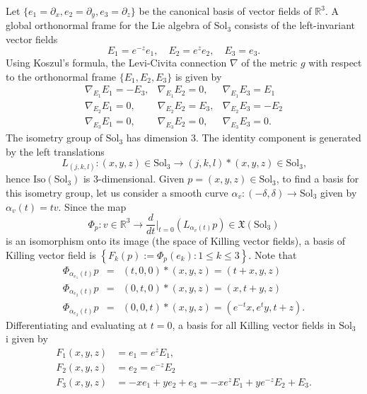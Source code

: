 \documentclass[a4paper,12pt]{amsart}
\theoremstyle{plain}
\theoremstyle{definition}
\def\r{\mathbb R}
\def\sol{\text{Sol}_3}
\begin{document}
Let $\{e_{1}=\partial_x, e_{2}=\partial_y,e_{3}=\partial_z \} $ be the canonical basis of vector fields of $\r^{3}$. 
 A global orthonormal frame for the Lie algebra of $\sol$ consists of the left-invariant vector fields
 $$E_1 = e^{-z}e_1, \quad E_2 = e^ze_2, \quad E_3 =e_3.$$
 Using Koszul’s formula, the Levi-Civita connection $\nabla$ of the metric $g$ with respect to the orthonormal frame $\{E_1, E_2, E_3\}$ is given by
\begin{equation}\label{nabla}
\begin{array}{ccc}
\nabla_{E_1}E_1 = -E_3, & \nabla_{E_1}E_2 = 0, & \nabla_{E_1}E_3 = E_1 \\
\nabla_{E_2}E_1 = 0, & \nabla_{E_2}E_2 = E_3, & \nabla_{E_2}E_3 = -E_2 \\
\nabla_{E_3}E_1 = 0, & \nabla_{E_3}E_2 = 0, & \nabla_{E_3}E_3 = 0.
\end{array}
\end{equation}
 The isometry group of $\sol$ has dimension 3. The identity component is generated by the left translations
\[
L_{( j,k,l) }:( x,y,z) \in \sol\rightarrow
( j,k,l) \ast ( x,y,z) \in \sol\text{,}
\]%
 hence $\mbox{Iso}(\sol)$ is 3-dimensional. Given $p=( x,y,z) \in \sol$, to find a basis for this isometry group, let us consider a smooth curve $%
\alpha _{v}:( -\delta ,\delta ) \rightarrow \sol$
given by $\alpha _{v}( t) =tv$. Since the map 
\begin{equation*}
\Phi
_{p}:v\in \r^{3}\rightarrow \frac{d}{dt}{\Big|}_{t=0}( L_{\alpha
_{v}( t) }p) \in \mathfrak{X}( \sol) 
\end{equation*}
is an isomorphism onto its image (the space of Killing vector fields), a
 basis of Killing vector field is $\left\{ F_{k}(
p) :=\Phi _{p}( e_{k})\colon 1\leq k\leq 3 \right\}$. Note
that%
\begin{eqnarray*}
\Phi_{\alpha _{e_{1}}( t) }p &=&( t,0,0) \ast (
x,y,z) =( t+x,y,z) \\
\Phi_{\alpha _{e_{2}}( t) }p &=&( 0,t,0) \ast (
x,y,z) =( x,t+y,z) \\
\Phi_{\alpha _{e_{2}}( t) }p &=&( 0,0,t) \ast (
x,y,z) =( e^{-t}x,e^{t}y,t+z) .
\end{eqnarray*}%
Differentiating and evaluating at $t=0$, a basis for all
Killing vector fields in $\sol$ i given by 
 \begin{equation}\label{kf}
 \begin{split}
 F_1(x,y,z)&=e_1=e^z E_1,\\
 F_2(x,y,z)&=e_2=e^{-z}E_2\\
 F_3(x,y,z)&=-xe_1+ye_2+e_3=-xe^z E_1+ye^{-z}E_2+E_3.
 \end{split}
 \end{equation}
\end{document}
